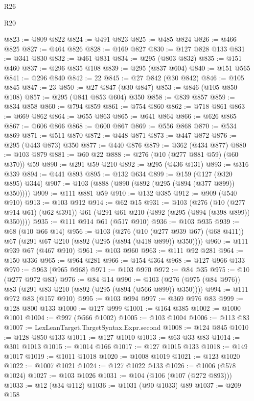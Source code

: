 \begin{lexlean}{R26}
\begin{lexlean}{R20}
\begin{coremodule}
{{{{{{{{{{{{{{{{{{{{{{{{{{{{{{{{{{{{{{{{{{{{{{{{{{{{{{{{{{{{{{{@823 := @809 @822
@824 := @491 @823
@825 := @485 @824
@826 := @466 @825
@827 := @464 @826
@828 := @169 @827
@830 := @127 @828 @133
@831 := @341 @830
@832 := @461 @831
@834 := @295 (@803 @832)
@835 := @151 @460
@837 := @296 @835 @108
@839 := @295 (@837 @604)
@840 := @151 @565
@841 := @296 @840
@842 := 22
@845 := @27 @842 (@30 @842)
@846 := @105 @845
@847 := 23
@850 := @27 @847 (@30 @847)
@853 := @846 (@105 @850 @108)
@857 := @295 (@841 @853 @604) @350
@858 := @839 @857
@859 := @834 @858
@860 := @794 @859
@861 := @754 @860
@862 := @718 @861
@863 := @669 @862
@864 := @655 @863
@865 := @641 @864
@866 := @626 @865
@867 := @606 @866
@868 := @600 @867
@869 := @556 @868
@870 := @534 @869
@871 := @511 @870
@872 := @448 @871
@873 := @447 @872
@876 := @295 (@443 @873) @350
@877 := @440 @876
@879 := @362 (@434 @877)
@880 := @103 @879
@881 := @60 @22
@888 := @276 (@10 (@277 @881 @59) (@60 @370)) @59
@890 := @291 @59 @210
@892 := @295 (@436 @131)
@893 := @316 @339
@894 := @441 @893
@895 := @132 @634
@899 := @159 (@127 (@320 @895) @344)
@907 := @103 (@888 (@890 (@892 (@295 (@894 (@377 @899)) @350))))
@909 := @111 @881 @59
@910 := @132 @385
@912 := @909 (@540 @910)
@913 := @103 @912
@914 := @62 @15
@931 := @103
    (@276
      (@10 (@277 @914 @61) (@62 @391))
      @61
      (@291 @61 @210 (@892 (@295 (@894 (@398 @899)) @350))))
@935 := @111 @914 @61 (@517 @910)
@936 := @103 @935
@939 := @68 (@10 @66 @14)
@956 := @103
    (@276
      (@10 (@277 @939 @67) (@68 @411))
      @67
      (@291 @67 @210 (@892 (@295 (@894 (@418 @899)) @350))))
@960 := @111 @939 @67 (@467 @910)
@961 := @103 @960
@963 := @111 @92 @281
@964 := @150 @336
@965 := @964 @281
@966 := @154 @364
@968 := @127 @966 @133
@970 := @963 (@965 @968)
@971 := @103 @970
@972 := @84 @35
@975 := @10 (@277 @972 @83)
@976 := @84 @14
@990 := @103 (@276 (@975 (@84 @976)) @83 (@291 @83 @210 (@892 (@295 (@894 (@566 @899)) @350))))
@994 := @111 @972 @83 (@157 @910)
@995 := @103 @994
@997 := @369 @976 @83
@999 := @128 @800 @133
@1000 := @127 @999
@1001 := @164 @385
@1002 := @1000 @1001
@1004 := @997 (@566 @1002)
@1005 := @103 @1004
@1006 := @113 @83
@1007 := LexLeanTarget.TargetSyntax.Expr.second
@1008 := @124 @845
@1010 := @128 @850 @133
@1011 := @127 @1010
@1013 := @63 @33 @83
@1014 := @301 @1013
@1015 := @1014 @166
@1017 := @127 @1015 @133
@1018 := @149 @1017
@1019 := @1011 @1018
@1020 := @1008 @1019
@1021 := @123 @1020
@1022 := @1007 @1021
@1024 := @127 @1022 @133
@1026 := @1006 (@578 @1024)
@1027 := @103 @1026
@1031 := @104 (@106 (@107 (@272 @893)))
@1033 := @12 (@34 @112)
@1036 := @1031 (@90 @1033) @89
@1037 := @209 @158
}}}}}}}}}}}}}}}}}}}}}}}}}}}}}}}}}}}}}}}}}}}}}}}}}}}}}}}}}}}}}}}
\end{coremodule}
\end{lexlean}
\end{lexlean}
